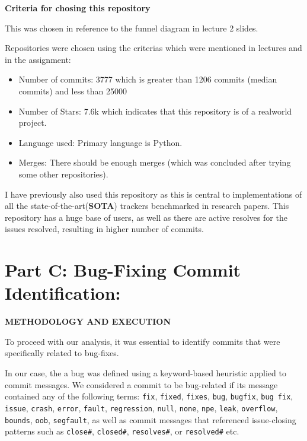 \documentclass[12pt, a4paper]{report}
\newcommand{\sectionbar}[1]{%
  \vspace{0.6\baselineskip}%
  \noindent
  \colorbox{sectionbar}{%
    \parbox{\dimexpr\linewidth-2\fboxsep\relax}{%
      \textbf{\Large\textsf{#1}}%
    }%
  }%
  \vspace{0.6\baselineskip}
}
\begin{document}

\textbf{Criteria for chosing this repository}

This was chosen in reference to the funnel diagram in lecture 2 slides.

Repositories were chosen using the criterias which were mentioned in lectures and in the assignment:
\begin{itemize}
    \item {Number of commits}: 3777 which is greater than 1206 commits (median commits) and less than 25000
    \item {Number of Stars}: 7.6k which indicates that this repository is of a real\-world project.
    \item {Language used}: Primary language is Python.
    \item {Merges}: There should be enough merges (which was concluded after trying some other repositories).
\end{itemize}

I have previously also used this repository as this is central to implementations of all the state-of-the-art(\textbf{SOTA}) trackers benchmarked in research papers. This repository has a huge base of users, as well as there are active resolves for the issues resolved, resulting in higher number of commits.


\newpage

\section{Part C: Bug-Fixing Commit Identification:}
\sectionbar{METHODOLOGY AND EXECUTION}

To proceed with our analysis, it was essential to identify commits that were specifically related to bug-fixes.

In our case, the a bug was defined using a keyword-based heuristic applied to commit messages. We considered a commit to be bug-related if its message contained any of the following terms:  
\texttt{fix}, \texttt{fixed}, \texttt{fixes}, \texttt{bug}, \texttt{bugfix}, \texttt{bug fix}, \texttt{issue}, \texttt{crash}, \texttt{error}, \texttt{fault}, \texttt{regression}, \texttt{null}, \texttt{none}, \texttt{npe}, \texttt{leak}, \texttt{overflow}, \texttt{bounds}, \texttt{oob}, \texttt{segfault}, as well as commit messages that referenced issue-closing patterns such as \texttt{close\#}, \texttt{closed\#}, \texttt{resolves\#}, or \texttt{resolved\#} etc.
\end{document}
